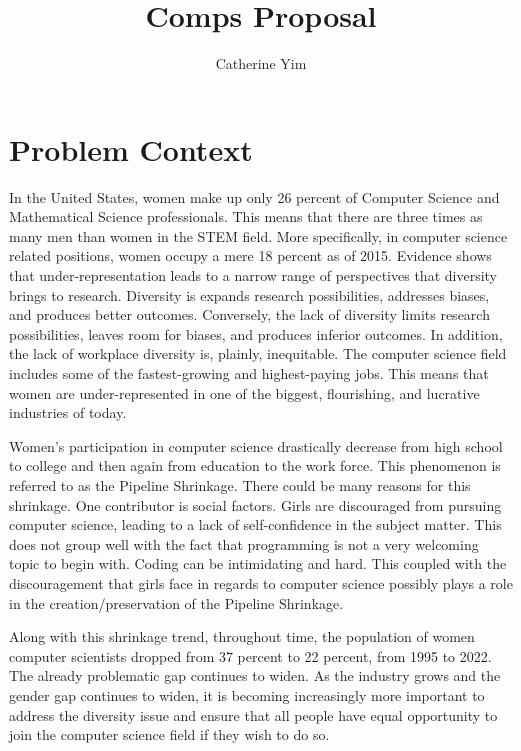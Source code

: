 \documentclass[10pt,twocolumn]{article}
\title{Comps Proposal}
\author{Catherine Yim}
\affiliation{Occidental College}
\begin{document}
\maketitle

\section{Problem Context}
In the United States, women make up only 26 percent of Computer Science and Mathematical Science professionals. \cite{wang2015gender} This means that there are three times as many men than women in the STEM field. More specifically, in computer science related positions, women occupy a mere 18 percent as of 2015. Evidence shows that under-representation leads to a narrow range of perspectives that diversity brings to research. Diversity is expands research possibilities, addresses biases, and produces better outcomes. \cite{ostrom2008difference} Conversely, the lack of diversity limits research possibilities, leaves room for biases, and produces inferior outcomes. In addition, the lack of workplace diversity is, plainly, inequitable. \cite{wang2015gender} The computer science field includes some of the fastest-growing and highest-paying jobs. This means that women are under-represented in one of the biggest, flourishing, and lucrative industries of today. \cite{ostrom2008difference}

Women's participation in computer science drastically decrease from high school to college and then again from education to the work force. \cite{bayliss2006games} This phenomenon is referred to as the Pipeline Shrinkage. There could be many reasons for this shrinkage. One contributor is social factors. Girls are discouraged from pursuing computer science, leading to a lack of self-confidence in the subject matter. This does not group well with the fact that programming is not a very welcoming topic to begin with. Coding can be intimidating and hard. This coupled with the discouragement that girls face in regards to computer science possibly plays a role in the creation/preservation of the Pipeline Shrinkage. 

Along with this shrinkage trend, throughout time, the population of women computer scientists dropped from 37 percent to 22 percent, from 1995 to 2022. \cite{girlswhocode2021} The already problematic gap continues to widen. As the industry grows and the gender gap continues to widen, it is becoming increasingly more important to address the diversity issue and ensure that all people have equal opportunity to join the computer science field if they wish to do so.
\end{document}
